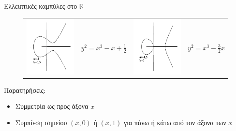 \documentclass[handout]{beamer}
\begin{document}
\begin{frame}[allowframebreaks]{Ελλειπτικές καμπύλες στο $\mathbb R$}
\begin{figure}
\begin{tiny}
\begin{tabular}{cccc}
        \includegraphics[scale=0.25]{qaz3.png} & $y^2 = x^3 - x +\frac{1}{2} $ &  \includegraphics[scale=0.25]{qaz4.png}  &  $y^2 = x^3 - \frac{3}{2}x $
\end{tabular}
\end{tiny}
\end{figure}

\framebreak

Παρατηρήσεις:
\begin{itemize}
\item Συμμετρία ως προς άξονα $x$
\item Συμπίεση σημείου $(x,0)$ ή $(x,1)$ για πάνω ή κάτω από τον άξονα των $x$
\end{itemize}


\end{frame}
\end{document}

